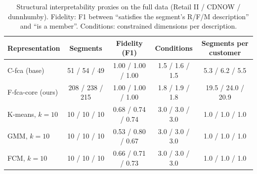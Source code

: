 \begin{table}[t]
\centering\footnotesize
\caption{Structural interpretability proxies on the full data (Retail II / CDNOW / dunnhumby). Fidelity: F1 between ``satisfies the segment's R/F/M description'' and ``is a member''. Conditions: constrained dimensions per description.}
\label{tab:interpretability}
\begin{tabular}{lcccc}
\toprule
Representation & Segments & Fidelity (F1) & Conditions & Segments per customer \\
\midrule
C-fca (base) & 51 / 54 / 49 & 1.00 / 1.00 / 1.00 & 1.5 / 1.6 / 1.5 & 5.3 / 6.2 / 5.5 \\
F-fca-core (ours) & 208 / 238 / 215 & 1.00 / 1.00 / 1.00 & 1.8 / 1.9 / 1.8 & 19.5 / 24.0 / 20.9 \\
K-means, $k{=}10$ & 10 / 10 / 10 & 0.68 / 0.74 / 0.74 & 3.0 / 3.0 / 3.0 & 1.0 / 1.0 / 1.0 \\
GMM, $k{=}10$ & 10 / 10 / 10 & 0.53 / 0.80 / 0.67 & 3.0 / 3.0 / 3.0 & 1.0 / 1.0 / 1.0 \\
FCM, $k{=}10$ & 10 / 10 / 10 & 0.66 / 0.71 / 0.73 & 3.0 / 3.0 / 3.0 & 1.0 / 1.0 / 1.0 \\
\bottomrule
\end{tabular}
\end{table}
